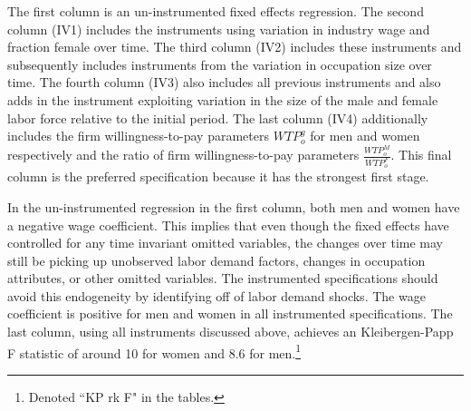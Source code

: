 \documentclass[12pt]{article}
\begin{document}
The first column is an un-instrumented fixed effects regression. The second column (IV1) includes the instruments using variation in industry wage and fraction female over time. The third column (IV2) includes these instruments and subsequently includes instruments from the variation in occupation size over time. The fourth column (IV3) also includes all previous instruments and also adds in the instrument exploiting variation in the size of the male and female labor force relative to the initial period. The last column (IV4) additionally includes the firm willingness-to-pay parameters $WTP^g_o$ for men and women respectively and the ratio of firm willingness-to-pay parameters  $\frac{WTP^M_o}{WTP^F_o}$. This final column is the preferred specification because it has the strongest first stage.




%
%
%
%
%
%
%
%
%
%
%
%



In the un-instrumented regression in the first column, both men and women have a negative wage coefficient. This implies that even though the fixed effects have controlled for any time invariant omitted variables, the changes over time may still be picking up unobserved labor demand factors, changes in occupation attributes, or other omitted variables. The instrumented specifications should avoid this endogeneity by identifying off of labor demand shocks. The wage coefficient is positive for men and women in all instrumented specifications. The last column, using all instruments discussed above, achieves an Kleibergen-Papp F statistic of around 10 for women and 8.6 for men.\footnote{Denoted ``KP rk F" in the tables.}
\end{document}
